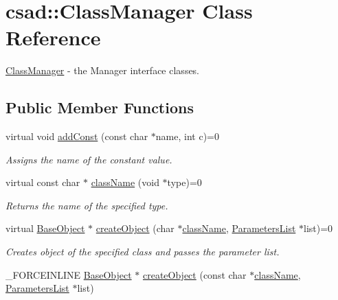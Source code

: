 \hypertarget{classcsad_1_1_class_manager}{\section{csad\-:\-:Class\-Manager Class Reference}
\label{classcsad_1_1_class_manager}
}


\hyperlink{classcsad_1_1_class_manager}{Class\-Manager} -\/ the Manager interface classes.  


\subsection*{Public Member Functions}
\begin{DoxyCompactItemize}
\item 
\hypertarget{classcsad_1_1_class_manager_a1b672a9bc1ce34daf388e278e4a877a0}{virtual void \hyperlink{classcsad_1_1_class_manager_a1b672a9bc1ce34daf388e278e4a877a0}{add\-Const} (const char $\ast$name, int c)=0}\label{classcsad_1_1_class_manager_a1b672a9bc1ce34daf388e278e4a877a0}

\begin{DoxyCompactList}\small\item\em Assigns the name of the constant value. \end{DoxyCompactList}\item 
\hypertarget{classcsad_1_1_class_manager_a60cb905c7bb8ffa55d7bdffcc6cf2bb1}{virtual const char $\ast$ \hyperlink{classcsad_1_1_class_manager_a60cb905c7bb8ffa55d7bdffcc6cf2bb1}{class\-Name} (void $\ast$type)=0}\label{classcsad_1_1_class_manager_a60cb905c7bb8ffa55d7bdffcc6cf2bb1}

\begin{DoxyCompactList}\small\item\em Returns the name of the specified type. \end{DoxyCompactList}\item 
\hypertarget{classcsad_1_1_class_manager_a7d52ba64630bd18ddecc08779c0a9d32}{virtual \hyperlink{classcsad_1_1_base_object}{Base\-Object} $\ast$ \hyperlink{classcsad_1_1_class_manager_a7d52ba64630bd18ddecc08779c0a9d32}{create\-Object} (char $\ast$\hyperlink{classcsad_1_1_class_manager_a60cb905c7bb8ffa55d7bdffcc6cf2bb1}{class\-Name}, \hyperlink{classbt_1_1_parameters_list}{Parameters\-List} $\ast$list)=0}\label{classcsad_1_1_class_manager_a7d52ba64630bd18ddecc08779c0a9d32}

\begin{DoxyCompactList}\small\item\em Creates object of the specified class and passes the parameter list. \end{DoxyCompactList}\item 
\hypertarget{classcsad_1_1_class_manager_ae20b1020a033cca51cd5c65b9af65709}{\-\_\-\-F\-O\-R\-C\-E\-I\-N\-L\-I\-N\-E \hyperlink{classcsad_1_1_base_object}{Base\-Object} $\ast$ \hyperlink{classcsad_1_1_class_manager_ae20b1020a033cca51cd5c65b9af65709}{create\-Object} (const char $\ast$\hyperlink{classcsad_1_1_class_manager_a60cb905c7bb8ffa55d7bdffcc6cf2bb1}{class\-Name}, \hyperlink{classbt_1_1_parameters_list}{Parameters\-List} $\ast$list)}\label{classcsad_1_1_class_manager_ae20b1020a033cca51cd5c65b9af65709}


\end{DoxyCompactItemize}
